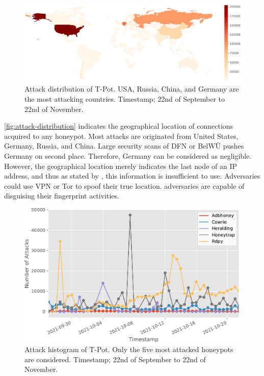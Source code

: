 \begin{figure}[ht]
    \centering
    \includegraphics[width=\textwidth]{figures/tpot-overview-map.pdf}
    \caption[Attack distribution of T-Pot]{Attack distribution of T-Pot. USA, Russia, China, and Germany are the most attacking countries. Timestamp; 22nd of September to 22nd of November.}
    \label{fig:attack-distribution}
\end{figure}

\autoref{fig:attack-distribution} indicates the geographical location of connections acquired to any honeypot.
Most attacks are originated from United States, Germany, Russia, and China.
Large security scans of DFN or BelWÜ pushes Germany on second place.
Therefore, Germany can be considered as negligible.
However, the geographical location merely indicates the last node of an IP address, and thus as stated by \citet{Kelly2021}, this information is insufficient to use.
Adversaries could use VPN or Tor to spoof their true location. 
adversaries are capable of disguising their fingerprint activities.%

\begin{figure}[ht]
    \centering
    \includegraphics[width=\textwidth]{figures/tpot-attacks-histogram.pdf}
    \caption[Attack histogram of T-Pot]{Attack histogram of T-Pot. Only the five most attacked honeypots are considered. Timestamp; 22nd of September to 22nd of November.}
    \label{tpot-overview-histogram}
\end{figure}

